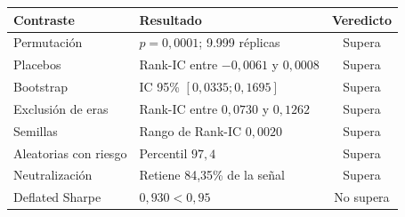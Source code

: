 \begin{tabular}{llc}
\toprule
Contraste & Resultado & Veredicto \\
\midrule
Permutación & $p=0,0001$; 9.999 réplicas & Supera \\
Placebos & Rank-IC entre $-0,0061$ y $0,0008$ & Supera \\
Bootstrap & IC 95\% $[0,0335; 0,1695]$ & Supera \\
Exclusión de eras & Rank-IC entre $0,0730$ y $0,1262$ & Supera \\
Semillas & Rango de Rank-IC $0,0020$ & Supera \\
Aleatorias con riesgo & Percentil $97,4$ & Supera \\
Neutralización & Retiene 84,35\% de la señal & Supera \\
Deflated Sharpe & $0,930 < 0,95$ & No supera \\
\bottomrule
\end{tabular}

